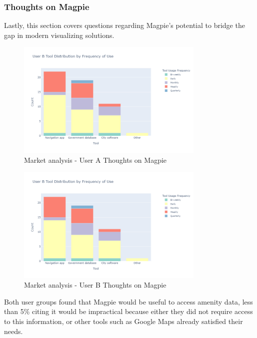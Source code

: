 \subsubsection{Thoughts on Magpie}
Lastly, this section covers questions regarding Magpie's potential to bridge the gap in modern visualizing solutions.
\begin{figure}[h!]
    \centering
    \includegraphics[width=0.8\textwidth]{images/mr-userb-tool-freq.png}
    \caption{Market analysis - User A Thoughts on Magpie}
\end{figure}
\begin{figure}[h!]
    \centering
    \includegraphics[width=0.8\textwidth]{images/mr-userb-tool-freq.png}
    \caption{Market analysis - User B Thoughts on Magpie}
\end{figure}

Both user groups found that Magpie would be useful to access amenity data, less than 5\% citing it would be impractical because either they did not require access to this information, or other tools such as Google Maps already satisfied their needs.

